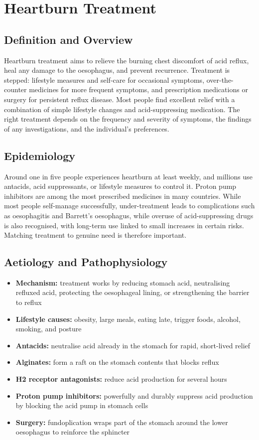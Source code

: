 \chapter{Heartburn Treatment}

\section*{Definition and Overview}
Heartburn treatment aims to relieve the burning chest discomfort of acid reflux, heal any damage to the oesophagus, and prevent recurrence. Treatment is stepped: lifestyle measures and self-care for occasional symptoms, over-the-counter medicines for more frequent symptoms, and prescription medications or surgery for persistent reflux disease. Most people find excellent relief with a combination of simple lifestyle changes and acid-suppressing medication. The right treatment depends on the frequency and severity of symptoms, the findings of any investigations, and the individual's preferences.

\section*{Epidemiology}
Around one in five people experiences heartburn at least weekly, and millions use antacids, acid suppressants, or lifestyle measures to control it. Proton pump inhibitors are among the most prescribed medicines in many countries. While most people self-manage successfully, under-treatment leads to complications such as oesophagitis and Barrett's oesophagus, while overuse of acid-suppressing drugs is also recognised, with long-term use linked to small increases in certain risks. Matching treatment to genuine need is therefore important.

\section*{Aetiology and Pathophysiology}
\begin{itemize}
    \item \textbf{Mechanism:} treatment works by reducing stomach acid, neutralising refluxed acid, protecting the oesophageal lining, or strengthening the barrier to reflux
    \item \textbf{Lifestyle causes:} obesity, large meals, eating late, trigger foods, alcohol, smoking, and posture
    \item \textbf{Antacids:} neutralise acid already in the stomach for rapid, short-lived relief
    \item \textbf{Alginates:} form a raft on the stomach contents that blocks reflux
    \item \textbf{H2 receptor antagonists:} reduce acid production for several hours
    \item \textbf{Proton pump inhibitors:} powerfully and durably suppress acid production by blocking the acid pump in stomach cells
    \item \textbf{Surgery:} fundoplication wraps part of the stomach around the lower oesophagus to reinforce the sphincter
\end{itemize}

